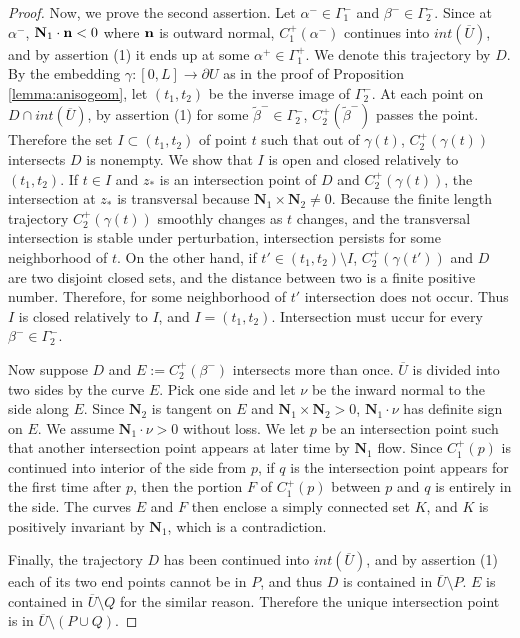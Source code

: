 \documentclass[11pt]{amsart}
\theoremstyle{plain}
\theoremstyle{remark}
\numberwithin{equation}{section}
\numberwithin{Thm}{section}
\def\U{\overline{U}}
\def\N{{\mathbf N}}
\def\n{{\bf n}}
\begin{document}
\begin{proof}

Now, we prove the second assertion. Let $\alpha^-\in \Gamma^-_1$ and $\beta^-\in \Gamma^-_2$. Since at $\alpha^-$,  $\N_1\cdot\n < 0$ where $\n$ is outward normal, $C^+_1(\alpha^-)$ continues into $int(\overline{U})$, and by assertion (1) it ends up at some $\alpha^+\in \Gamma^+_1$. We denote this trajectory by $D$. By the embedding $\gamma: [0,L] \rightarrow \partial U$ as in the proof of Proposition \ref{lemma:anisogeom}, let $(t_1,t_2)$ be the inverse image of $\Gamma^-_2$. At each point on $D \cap int(\U)$, by assertion (1) for some $\tilde{\beta}^-\in \Gamma^-_2$, $C^+_2(\tilde \beta^-)$ passes the point. Therefore the set $I \subset (t_1,t_2)$ of point $t$ such that out of $\gamma(t)$, $C^+_2(\gamma(t))$ intersects $D$ is nonempty. We show that $I$ is open and closed relatively to $(t_1,t_2)$. If $t \in I$ and $z_*$ is an intersection point of $D$ and $C^+_2(\gamma(t))$, the intersection at $z_*$ is transversal  because $\N_1 \times \N_2 \ne 0$. Because the finite length trajectory $C^+_2(\gamma(t))$ smoothly changes as $t$ changes, and the transversal intersection is stable under perturbation, intersection persists for some neighborhood of $t$. On the other hand, if $t' \in (t_1,t_2) \setminus I$, $C^+_2(\gamma(t'))$ and $D$ are two disjoint closed sets, and the distance between two is a finite positive number. Therefore, for some neighborhood of $t'$ intersection does not occur. Thus $I$ is closed relatively to $I$, and $I = (t_1,t_2)$. Intersection must uccur for every $\beta^-\in \Gamma^-_2$.

Now suppose $D$ and $E:=C^+_2(\beta^-)$ intersects more than once. $\overline{U}$ is divided into two sides by the curve $E$. Pick one side and let $\nu$ be the inward normal to the side along $E$. Since $\N_2$ is tangent on $E$ and $\N_1\times \N_2>0$, $\N_1\cdot \nu$ has definite sign on $E$. We assume $\N_1\cdot \nu>0$ without loss. We let $p$ be an intersection point such that another intersection point appears at later time by $\N_1$ flow. Since $C^+_1(p)$ is continued into interior of the side from $p$, if $q$ is the intersection point appears for the first time after $p$, then the portion $F$ of $C^+_1(p)$ between $p$ and $q$ is entirely in the side. The curves $E$ and $F$ then enclose a simply connected set $K$, and $K$ is positively invariant by $\N_1$, which is a contradiction. 

Finally, the trajectory $D$ has been continued into $int(\overline{U})$, and by assertion (1) each of its two end points cannot be in $P$, and thus $D$ is contained in $\overline{U}\setminus P$. $E$ is contained in $\overline{U}\setminus Q$ for the similar reason. Therefore the unique intersection point is in $\overline{U}\setminus (P \cup Q)$.
\end{proof}
\end{document}
